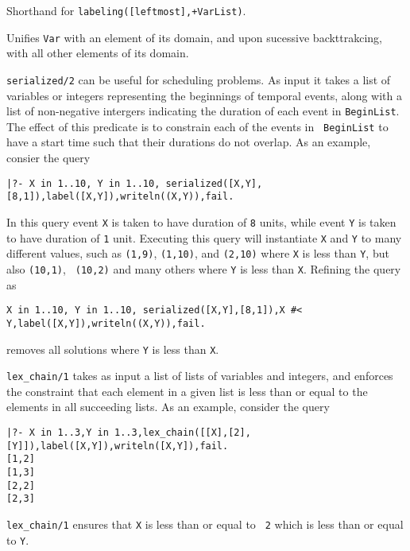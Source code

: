 \begin{description}
%
Shorthand for {\tt labeling([leftmost],+VarList)}.

%
Unifies {\tt Var} with an element of its domain, and upon sucessive
backttrakcing, with all other elements of its domain.

% 
{\tt serialized/2} can be useful for scheduling problems.  As input it
takes a list of variables or integers representing the beginnings of
temporal events, along with a list of non-negative intergers
indicating the duration of each event in {\tt BeginList}.  The effect
of this predicate is to constrain each of the events in {\tt
  BeginList} to have a start time such that their durations do not
overlap.  As an example, consier the query
%
{\small
\begin{verbatim}
|?- X in 1..10, Y in 1..10, serialized([X,Y],[8,1]),label([X,Y]),writeln((X,Y)),fail.
\end{verbatim}
}
%
In this query event {\tt X} is taken to have duration of {\tt 8}
units, while event {\tt Y} is taken to have duration of {\tt 1} unit.
Executing this query will instantiate {\tt X} and {\tt Y} to many
different values, such as {\tt (1,9)}, {\tt (1,10)}, and {\tt (2,10)}
where {\tt X} is less than {\tt Y}, but also {\tt (10,1)}, {\tt
  (10,2)} and many others where {\tt Y} is less than {\tt X}.  Refining the query as
%
{\small
\begin{verbatim}
X in 1..10, Y in 1..10, serialized([X,Y],[8,1]),X #< Y,label([X,Y]),writeln((X,Y)),fail.
\end{verbatim}
}
%
removes all solutions where {\tt Y} is less than {\tt X}.

%
{\tt lex\_chain/1} takes as input a list of lists of variables and
integers, and enforces the constraint that each element in a given
list is less than or equal to the elements in all succeeding lists.
As an example, consider the query
%
{\small
\begin{verbatim}
|?- X in 1..3,Y in 1..3,lex_chain([[X],[2],[Y]]),label([X,Y]),writeln([X,Y]),fail.
[1,2]
[1,3]
[2,2]
[2,3]
\end{verbatim}
}
%
{\tt lex\_chain/1} ensures that {\tt X} is less than or equal to {\tt
  2} which is less than or equal to {\tt Y}.


\end{description}

